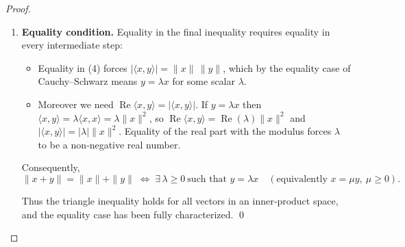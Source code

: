 \begin{proof}
\begin{enumerate}
\item \textbf{Equality condition.}  
Equality in the final inequality requires equality in every intermediate step:
\begin{itemize}
\item Equality in (4) forces $|\langle x,y\rangle|=\|x\|\,\|y\|$, which by the equality case of Cauchy–Schwarz means $y=\lambda x$ for some scalar $\lambda$.
\item Moreover we need $\operatorname{Re}\langle x,y\rangle=|\langle x,y\rangle|$. If $y=\lambda x$ then $\langle x,y\rangle=\lambda\langle x,x\rangle=\lambda\|x\|^{2}$, so $\operatorname{Re}\langle x,y\rangle=\operatorname{Re}(\lambda)\|x\|^{2}$ and $|\langle x,y\rangle|=|\lambda|\|x\|^{2}$. Equality of the real part with the modulus forces $\lambda$ to be a non‑negative real number.
\end{itemize}
Consequently,
\[
\|x+y\|=\|x\|+\|y\|
\;\Longleftrightarrow\;
\exists\,\lambda\ge0\ \text{such that } y=\lambda x
\quad(\text{equivalently } x=\mu y,\ \mu\ge0).
\]

Thus the triangle inequality holds for all vectors in an inner‑product space, and the equality case has been fully characterized. \qed
\end{enumerate}
\end{proof}